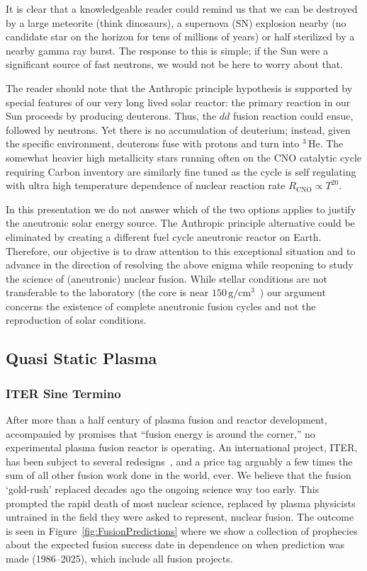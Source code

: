 \documentclass[particles,article,accept,pdftex,moreauthors]{Definitions/mdpi}
\begin{document}
It is clear that a knowledgeable reader could remind us that we can be destroyed by a large meteorite (think dinosaurs), a supernova (SN) explosion nearby (no candidate star on the horizon for tens of millions of years) or half sterilized by a nearby gamma ray burst. The response to this is simple; if the Sun were a significant source of fast neutrons, we would not be here to worry about that.

The reader should note that the Anthropic principle hypothesis is supported by special features of our very long lived solar reactor: the primary reaction in our Sun proceeds by producing deuterons. Thus, the $dd$ fusion reaction could ensue, followed by neutrons. Yet there is no accumulation of deuterium; instead, given the specific environment, deuterons fuse with protons and turn into ${}^3\,\mathrm{He}$. The somewhat heavier high metallicity stars running often on the CNO catalytic cycle requiring Carbon inventory are similarly fine tuned as the cycle is self regulating with ultra high temperature dependence of nuclear reaction rate $R_\mathrm{CNO}\propto T^{20}$.

In this presentation we do not answer which of the two options applies to justify the aneutronic solar energy source. The Anthropic principle alternative could be eliminated by creating a different fuel cycle aneutronic reactor on Earth. Therefore, our objective is to draw attention to this exceptional situation and to advance in the direction of resolving the above enigma while reopening to study the science of (aneutronic) nuclear fusion. While stellar conditions are not transferable to the laboratory (the core is near $150\,\mathrm{g/cm^3}$~\cite{Bahcall:2000nu}) our argument concerns the existence of complete aneutronic fusion cycles and not the reproduction of solar conditions.


\subsection{Quasi Static Plasma}\label{ssec:plasmaF}
\subsubsection{ITER Sine Termino}\label{sssec:INTiter}
After more than a half century of plasma fusion and reactor development, accompanied by promises that ``fusion energy is around the corner,'' no experimental plasma fusion reactor is operating. An international project, ITER, has been subject to several redesigns~\cite{Aymer:2001,ITR-18-003,ITR-24-005,loarte2025new}, and a price tag arguably a few times the sum of all other fusion work done in the world, ever. We believe that the fusion `gold-rush' replaced decades ago the ongoing science way too early. This prompted the rapid death of most nuclear science, replaced by plasma physicists untrained in the field they were asked to represent, nuclear fusion. The outcome is seen in Figure~\ref{fig:FusionPredictions} where we show a collection of prophecies about the expected fusion success date in dependence on when prediction was made (1986--2025), which include all fusion projects.
\end{document}
